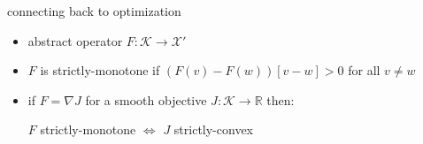 \documentclass[aspectratio=169,10pt]{beamer}
\newcommand{\cK}{{\mathcal{K}}}
\newcommand{\cX}{{\mathcal{X}}}
\newcommand{\RR}{{\mathbb{R}}}
\newcommand{\grad}{\nabla}
\begin{document}
\begin{frame}{connecting back to optimization}

\begin{itemize}
\item abstract operator $F:\cK \to \cX'$
\item $F$ is \alert{strictly-monotone} if $\left(F(v)-F(w)\right)[v-w] > 0$ for all $v\ne w$

\bigskip
  \centerline{ \qquad\qquad {}}

\pause
\medskip
\item if $F=\grad J$ for a smooth objective $J:\cK\to\RR$ then:

\medskip
\centerline{$F$ strictly-monotone $\iff$ $J$ strictly-convex}
\end{itemize}
\end{frame}
\end{document}
